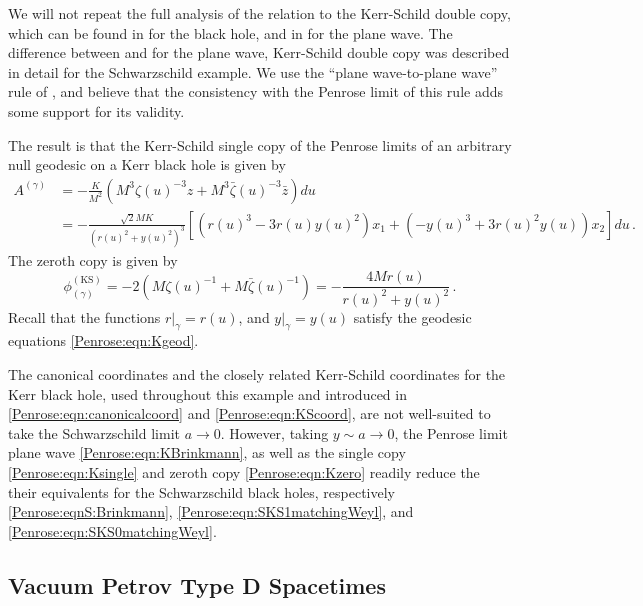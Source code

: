 We will not repeat the full analysis of the relation to the Kerr-Schild double copy, which can be found in \cite{Monteiro:2014cda} for the black hole, and in \cite{Luna:2018dpt} for the plane wave.  The difference between \cite{Monteiro:2014cda} and \cite{Luna:2018dpt} for the plane wave, Kerr-Schild double copy was described in detail for the Schwarzschild example. We use the ``plane wave-to-plane wave'' rule of \cite{Luna:2018dpt}, and believe that the consistency with the Penrose limit of this rule adds some support for its validity.

The result is that the Kerr-Schild single copy of the Penrose limits of an arbitrary null geodesic on a Kerr black hole is given by 
\begin{equation}\label{Penrose:eqn:Ksingle}
\begin{aligned}
	A^{(\gamma)} &= -\frac{K}{M^2}\left( M^3 \zeta(u)^{-3} z + M^3 \bar{\zeta}(u)^{-3} \bar{z}\right)du \\ &=  -\frac{\sqrt{2} M K}{\left(r(u)^2+y(u)^2\right)^3} \left\lbrack \left(r(u)^3 -3 r(u) y(u)^2\right)x_1 + \left(-y(u)^3 +3 r(u)^2 y(u)\right)x_2\right\rbrack du \, .
\end{aligned}
\end{equation}
The zeroth copy is given by
\begin{equation}\label{Penrose:eqn:Kzero}
\phi^{(\mathrm{KS})}_{(\gamma)} = - 2\left( M \zeta(u)^{-1} + M \bar{\zeta}(u)^{-1}\right) =- \frac{4 M r(u)}{r(u)^2+y(u)^2} \, .
\end{equation}
Recall that the functions $r|_{\gamma} = r(u)$, and  $y|_{\gamma} = y(u)$ satisfy the geodesic equations \eqref{Penrose:eqn:Kgeod}. 

The canonical coordinates and the closely related Kerr-Schild coordinates for the Kerr black hole, used throughout this example and introduced in \eqref{Penrose:eqn:canonicalcoord} and \eqref{Penrose:eqn:KScoord}, are not well-suited to take the Schwarzschild limit $a \to 0$. However, taking $y \sim a \to 0$, the Penrose limit plane wave \eqref{Penrose:eqn:KBrinkmann}, as well as the single copy \eqref{Penrose:eqn:Ksingle} and zeroth copy \eqref{Penrose:eqn:Kzero} readily reduce the their equivalents for the Schwarzschild black holes, respectively \eqref{Penrose:eqnS:Brinkmann}, \eqref{Penrose:eqn:SKS1matchingWeyl}, and \eqref{Penrose:eqn:SKS0matchingWeyl}.


\subsection{Vacuum Petrov Type D Spacetimes}\label{Penrose:sec:typeD}

